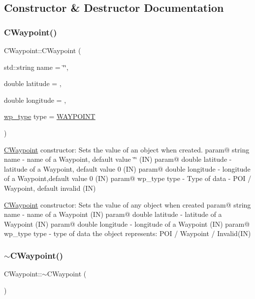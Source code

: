 \subsection{Constructor \& Destructor Documentation}
\mbox{\label{classCWaypoint_addbb5ff027b48242d3e905ccfb7c6453}} 
\subsubsection{\texorpdfstring{C\+Waypoint()}{CWaypoint()}}
{\footnotesize\ttfamily C\+Waypoint\+::\+C\+Waypoint (\begin{DoxyParamCaption}\item[{std\+::string}]{name = {\ttfamily \char`\"{}\char`\"{}},  }\item[{double}]{latitude = {},  }\item[{double}]{longitude = {},  }\item[{\hyperlink{classCWaypoint_afc0d93011dc8399f17e05ea26f1abb8a}{wp\+\_\+type}}]{type = {\ttfamily \hyperlink{classCWaypoint_afc0d93011dc8399f17e05ea26f1abb8aa22c9bb710a20488e41e0522f836edcee}{W\+A\+Y\+P\+O\+I\+NT}} }\end{DoxyParamCaption})}

\hyperlink{classCWaypoint}{C\+Waypoint} constructor\+: Sets the value of an object when created. param@ string name -\/ name of a Waypoint, default value \char`\"{}\char`\"{} (IN) param@ double latitude -\/ latitude of a Waypoint, default value 0 (IN) param@ double longitude -\/ longitude of a Waypoint,default value 0 (IN) param@ wp\+\_\+type type -\/ Type of data -\/ P\+OI / Waypoint, default invalid (IN)

\hyperlink{classCWaypoint}{C\+Waypoint} constructor\+: Sets the value of any object when created param@ string name -\/ name of a Waypoint (IN) param@ double latitude -\/ latitude of a Waypoint (IN) param@ double longitude -\/ longitude of a Waypoint (IN) param@ wp\+\_\+type type -\/ type of data the object represents\+: P\+OI / Waypoint / Invalid(\+I\+N) \mbox{\label{classCWaypoint_a74c7197b95df5dc4e631935d33c5ad27}} 
\subsubsection{\texorpdfstring{$\sim$\+C\+Waypoint()}{~CWaypoint()}}
{\footnotesize\ttfamily C\+Waypoint\+::$\sim$\+C\+Waypoint (\begin{DoxyParamCaption}{ }\end{DoxyParamCaption})\hspace{0.3cm}{\ttfamily [virtual]}}

